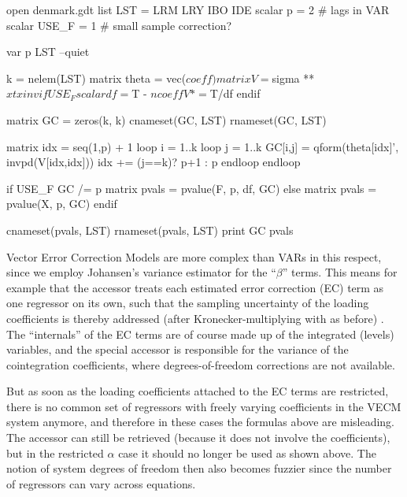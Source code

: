 \begin{script}[htbp]
\begin{scode}
open denmark.gdt
list LST = LRM LRY IBO IDE
scalar p = 2 # lags in VAR
scalar USE_F = 1 # small sample correction?

var p LST --quiet

k = nelem(LST)
matrix theta = vec($coeff)
matrix V = $sigma ** $xtxinv
if USE_F
  scalar df = $T - $ncoeff
  V *= $T/df
endif

matrix GC = zeros(k, k)
cnameset(GC, LST)
rnameset(GC, LST)

matrix idx = seq(1,p) + 1
loop i = 1..k
  loop j = 1..k
    GC[i,j] = qform(theta[idx]', invpd(V[idx,idx]))
    idx += (j==k)? p+1 : p
  endloop
endloop

if USE_F
  GC /= p
  matrix pvals = pvalue(F, p, df, GC)
else
  matrix pvals = pvalue(X, p, GC)
endif

cnameset(pvals, LST)
rnameset(pvals, LST)
print GC pvals
\end{scode}
\end{script}

Vector Error Correction Models are more complex than VARs in this
respect, since we employ Johansen's variance estimator for the
``$\beta$'' terms. 
This means for example that the  accessor treats each estimated 
error correction (EC) term as one regressor on its own, such that the sampling uncertainty
of the loading coefficients is thereby addressed (after Kronecker-multiplying with 
 as before) . The ``internals'' of the EC terms
are of course made up of the integrated (levels) variables, and the special
 accessor is responsible for the variance of the cointegration coefficients,
where degrees-of-freedom corrections are not available. 

But as soon as the loading coefficients attached to the EC terms are restricted, there is 
no common set of regressors with freely varying coefficients in the VECM system anymore,
and therefore in these cases the formulas above are misleading. The  
accessor can still be retrieved (because it does not involve the coefficients), but in 
the restricted $\alpha$ case it should no longer be used as shown above. 
The notion of system degrees of freedom then also becomes fuzzier since the number of 
regressors can vary across equations.

